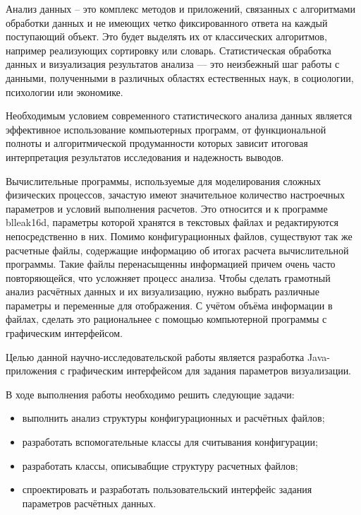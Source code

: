 
Анализ данных – это комплекс методов и приложений, связанных с алгоритмами обработки данных и не имеющих четко фиксированного ответа на каждый поступающий объект. Это будет выделять их от классических алгоритмов, например реализующих сортировку или словарь. Статистическая обработка данных и визуализация результатов анализа — это неизбежный шаг работы с данными, полученными в различных областях естественных наук, в социологии, психологии или экономике.

Необходимым условием современного статистического анализа данных является эффективное использование компьютерных программ, от функциональной полноты и алгоритмической продуманности которых зависит итоговая интерпретация результатов исследования и надежность выводов. 

Вычислительные программы, используемые для моделирования сложных физических процессов, зачастую имеют значительное количество настроечных параметров и условий выполнения расчетов. Это относится и к программе blleak16d, параметры которой хранятся в текстовых файлах и редактируются непосредственно в них. Помимо конфигурационных файлов, существуют так же расчетные файлы, содержащие информацию об итогах расчета вычислительной программы. Такие файлы перенасыщенны информацией причем очень часто повторяющейся, что усложняет процесс анализа. Чтобы сделать грамотный анализ расчётных данных и их визуализацию, нужно выбрать различные параметры и переменные для отображения. С учётом объёма информации в файлах, сделать это рациональнее с помощью компьютерной программы с графическим интерфейсом.  


Целью данной научно-исследовательской работы является разработка Java-приложения с графическим интерфейсом для задания параметров визуализации. 
\medskip

В ходе выполнения работы необходимо решить следующие задачи:

\begin{itemize}
	\item выполнить анализ структуры конфигурационных и расчётных файлов;
	\item разработать вспомогательные классы для считывания конфигурации;
	\item разработать классы, описывабщие структуру расчетных файлов;
	\item спроектировать и разработать пользовательский интерфейс задания параметров расчётных данных.	
\end{itemize}